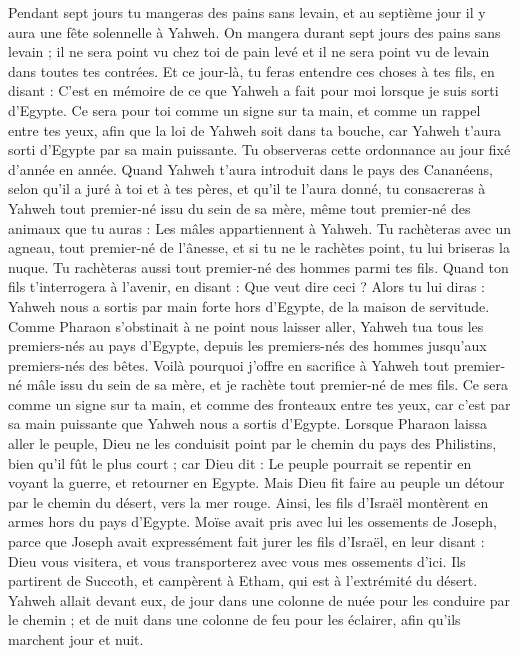 \begin{multicols}{2}
Pendant sept jours tu mangeras des pains sans levain, et au septième jour il y aura une fête solennelle à Yahweh.
On mangera durant sept jours des pains sans levain ; il ne sera point vu chez toi de pain levé et il ne sera point vu de levain dans toutes tes contrées.
Et ce jour-là, tu feras entendre ces choses à tes fils, en disant : C'est en mémoire de ce que Yahweh a fait pour moi lorsque je suis sorti d'Egypte.
Ce sera pour toi comme un signe sur ta main, et comme un rappel entre tes yeux, afin que la loi de Yahweh soit dans ta bouche, car Yahweh t'aura sorti d'Egypte par sa main puissante.
Tu observeras cette ordonnance au jour fixé d’année en année.
Quand Yahweh t'aura introduit dans le pays des Cananéens, selon qu'il a juré à toi et à tes pères, et qu'il te l'aura donné,
tu consacreras à Yahweh tout premier-né issu du sein de sa mère, même tout premier-né des animaux que tu auras : Les mâles appartiennent à Yahweh.
Tu rachèteras avec un agneau, tout premier-né de l’ânesse, et si tu ne le rachètes point, tu lui briseras la nuque. Tu rachèteras aussi tout premier-né des hommes parmi tes fils.
Quand ton fils t'interrogera à l'avenir, en disant : Que veut dire ceci ? Alors tu lui diras : Yahweh nous a sortis par main forte hors d'Egypte, de la maison de servitude.
Comme Pharaon s’obstinait à ne point nous laisser aller, Yahweh tua tous les premiers-nés au pays d'Egypte, depuis les premiers-nés des hommes jusqu’aux premiers-nés des bêtes. Voilà pourquoi j’offre en sacrifice à Yahweh tout premier-né mâle issu du sein de sa mère, et je rachète tout premier-né de mes fils.
Ce sera comme un signe sur ta main, et comme des fronteaux entre tes yeux, car c’est par sa main puissante que Yahweh nous a sortis d'Egypte.
Lorsque Pharaon laissa aller le peuple, Dieu ne les conduisit point par le chemin du pays des Philistins, bien qu'il fût le plus court ; car Dieu dit : Le peuple pourrait se repentir en voyant la guerre, et retourner en Egypte.
Mais Dieu fit faire au peuple un détour par le chemin du désert, vers la mer rouge. Ainsi, les fils d'Israël montèrent en armes hors du pays d'Egypte.
Moïse avait pris avec lui les ossements de Joseph, parce que Joseph avait expressément fait jurer les fils d'Israël, en leur disant : Dieu vous visitera, et vous transporterez avec vous mes ossements d'ici.
Ils partirent de Succoth, et campèrent à Etham, qui est à l’extrémité du désert.
Yahweh allait devant eux, de jour dans une colonne de nuée pour les conduire par le chemin ; et de nuit dans une colonne de feu pour les éclairer, afin qu'ils marchent jour et nuit.

\end{multicols}
